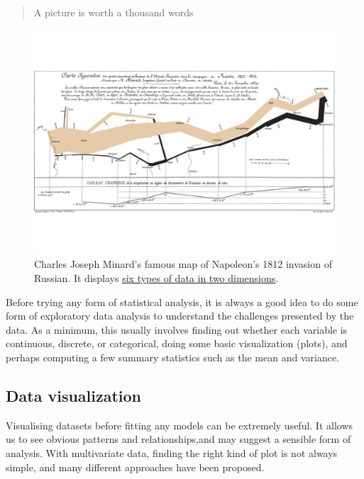 \documentclass[]{book}
\theoremstyle{definition}
\theoremstyle{definition}
\theoremstyle{definition}
\theoremstyle{remark}
\begin{document}
\begin{quote}
A picture is worth a thousand words
\end{quote}

\begin{figure}
\centering
\includegraphics{figs/Minard.jpg}
\caption{\label{fig:unnamed-chunk-5}Charles Joseph Minard's famous map of Napoleon's 1812 invasion of Russian. It displays \href{https://en.wikipedia.org/wiki/Charles_Joseph_Minard\#The_map_of_Napoleon's_Russian_campaign}{six types of data in two dimensions}.}
\end{figure}

Before trying any form of statistical analysis, it is always a good idea to do some form of exploratory data analysis to understand the challenges presented by the data. As a minimum, this usually involves finding out whether each variable is continuous, discrete, or categorical, doing some basic visualization (plots), and perhaps computing a few summary statistics such as the mean and variance.

\hypertarget{data-visualization}{%
\subsection{Data visualization}\label{data-visualization}}

Visualising datasets before fitting any models can be extremely useful. It allows us to see obvious patterns and relationships,and may suggest a sensible form of analysis.
With multivariate data, finding the right kind of plot is not always simple, and many different approaches have been proposed.
\end{document}
